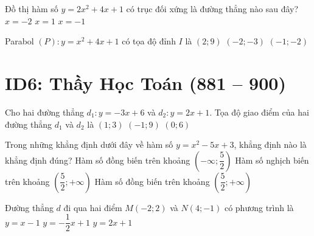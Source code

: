 \begin{ex}%
	Đồ thị hàm số $y=2x^2+4x+1$ có trục đối xứng là đường thẳng nào sau đây?
	{$x=-2 $}
	{$x=1 $}
	{\True $x=-1$}
\end{ex}

\begin{ex}%
	Parabol $(P)\colon y=x^2+4x+1$ có tọa độ đỉnh $I$ là
	{$(2;9) $}
	{\True $(-2;-3) $}
	{$(-1;-2) $}
\end{ex}

\section*{ID6: Thầy Học Toán (881 -- 900)}
\begin{ex}%
	Cho hai đường thẳng $d_1:y=-3x+6$ và $d_2:y=2x+1$. Tọa độ giao điểm của hai đường thẳng $d_1$ và $d_2$ là
	{\True $(1;3) $}
	{$(-1;9) $}
	{$(0;6) $}
\end{ex}

\begin{ex}%
	Trong những khẳng định dưới đây về hàm số $y=x^2-5x+3$, khẳng định nào là khẳng định đúng?
	{Hàm số đồng biến trên khoảng $\left(- \infty; \dfrac{5}{2} \right)$}
	{Hàm số nghịch biến trên khoảng $\left( \dfrac{5}{2}; +\infty \right)$}
	{\True Hàm số đồng biến trên khoảng $\left( \dfrac{5}{2}; +\infty \right)$}
\end{ex}

\begin{ex}%
	Đường thẳng $d$ đi qua hai điểm $M(-2;2)$ và $N(4;-1)$ có phương trình là
	{$y=x-1 $}
	{\True $y=-\dfrac{1}{2}x+1 $}
	{$y=2x+1 $}
\end{ex}

